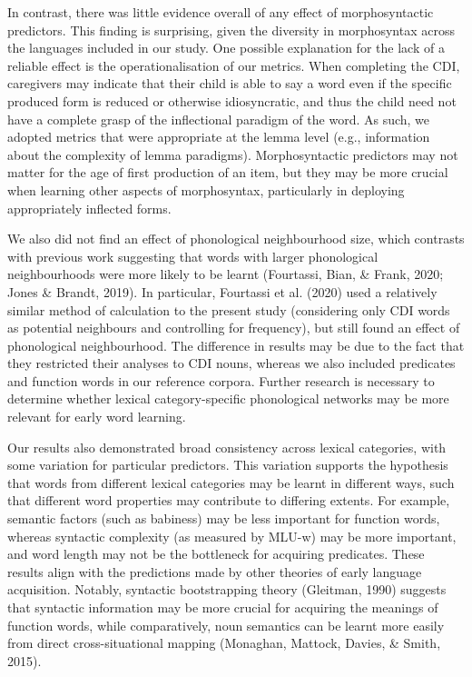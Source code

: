 \documentclass[10pt, letterpaper]{article}
\begin{document}
In contrast, there was little evidence overall of any effect of
morphosyntactic predictors. This finding is surprising, given the
diversity in morphosyntax across the languages included in our study.
One possible explanation for the lack of a reliable effect is the
operationalisation of our metrics. When completing the CDI, caregivers
may indicate that their child is able to say a word even if the specific
produced form is reduced or otherwise idiosyncratic, and thus the child
need not have a complete grasp of the inflectional paradigm of the word.
As such, we adopted metrics that were appropriate at the lemma level
(e.g., information about the complexity of lemma paradigms).
Morphosyntactic predictors may not matter for the age of first
production of an item, but they may be more crucial when learning other
aspects of morphosyntax, particularly in deploying appropriately
inflected forms.

We also did not find an effect of phonological neighbourhood size, which
contrasts with previous work suggesting that words with larger
phonological neighbourhoods were more likely to be learnt (Fourtassi,
Bian, \& Frank, 2020; Jones \& Brandt, 2019). In particular, Fourtassi
et al. (2020) used a relatively similar method of calculation to the
present study (considering only CDI words as potential neighbours and
controlling for frequency), but still found an effect of phonological
neighbourhood. The difference in results may be due to the fact that
they restricted their analyses to CDI nouns, whereas we also included
predicates and function words in our reference corpora. Further research
is necessary to determine whether lexical category-specific phonological
networks may be more relevant for early word learning.

Our results also demonstrated broad consistency across lexical
categories, with some variation for particular predictors. This
variation supports the hypothesis that words from different lexical
categories may be learnt in different ways, such that different word
properties may contribute to differing extents. For example, semantic
factors (such as babiness) may be less important for function words,
whereas syntactic complexity (as measured by MLU-w) may be more
important, and word length may not be the bottleneck for acquiring
predicates. These results align with the predictions made by other
theories of early language acquisition. Notably, syntactic bootstrapping
theory (Gleitman, 1990) suggests that syntactic information may be more
crucial for acquiring the meanings of function words, while
comparatively, noun semantics can be learnt more easily from direct
cross-situational mapping (Monaghan, Mattock, Davies, \& Smith, 2015).
\end{document}
